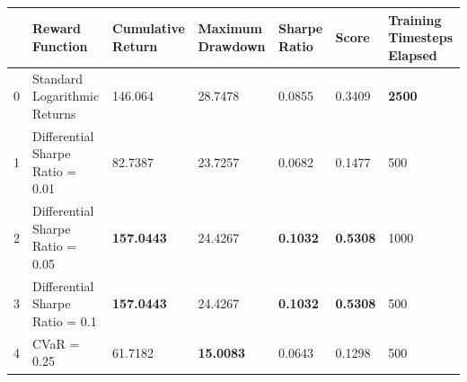 \begin{tabular}{lllllll}
\toprule
 & Reward Function & Cumulative Return & Maximum Drawdown & Sharpe Ratio & Score & Training Timesteps Elapsed \\
\midrule
0 & Standard Logarithmic Returns & 146.064 & 28.7478 & 0.0855 & 0.3409 & \textbf{2500} \\
1 & Differential Sharpe Ratio = 0.01 & 82.7387 & 23.7257 & 0.0682 & 0.1477 & 500 \\
2 & Differential Sharpe Ratio = 0.05 & \textbf{157.0443} & 24.4267 & \textbf{0.1032} & \textbf{0.5308} & 1000 \\
3 & Differential Sharpe Ratio = 0.1 & \textbf{157.0443} & 24.4267 & \textbf{0.1032} & \textbf{0.5308} & 500 \\
4 & CVaR = 0.25 & 61.7182 & \textbf{15.0083} & 0.0643 & 0.1298 & 500 \\
\bottomrule
\end{tabular}

